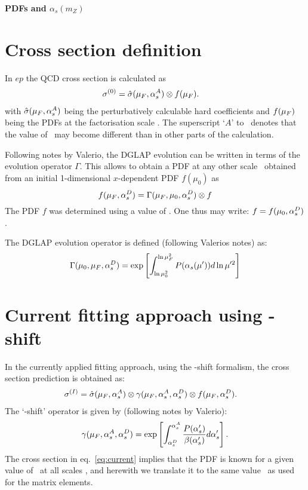 \documentclass[12pt]{article}
\begin{document}
\vspace{1cm}
\begin{center}
\begin{Large}

{\bf     \boldmath
  PDFs and $\alpha_s(m_Z)$
}
\end{Large}
\end{center}
\vspace{0.5cm}

\section{Cross section definition}
In $ep$ the QCD cross section is calculated as
\begin{align}
  \sigma^{(0)} &= \hat\sigma(\mu_{F},\alpha_s^A) \otimes f(\mu_{F}).
\label{eq:sig0}
\end{align}
with $\hat\sigma(\mu_{F},\alpha_s^A)$ being the perturbatively calculable hard coefficients
and $f(\mu_{F})$ being the PDFs at the factorisation scale \muf.
The superscript `$A$' to \as\ denotes that the value of \asmz\ may become different than in other parts of the calculation.

Following notes by Valerio, the DGLAP evolution can be written
in terms of the evolution operator $\Gamma$. 
This allows to obtain a PDF at any other scale \muf\ obtained from an initial 1-dimensional $x$-dependent PDF $f(\mu_0)$ as
\begin{equation}
  f(\mu_{F},\alpha_s^D) = \Gamma(\mu_{F},\mu_0,\alpha_s^D) \otimes f
\end{equation}
The PDF $f$ was determined using a value of \asD. One thus may write: $f = f(\mu_0,\alpha_s^D)$.

The DGLAP evolution operator is defined (following Valerios notes) as:
\begin{align}
  \Gamma(\mu_0,\mu_{F},\alpha_s^D)  = \exp\left[ \int_{\ln\mu^2_0}^{\ln\mu_{F}^2} P(\alpha_s(\mu^\prime) ) d\ln\mu^{\prime2} \right]
\end{align}



\section{Current fitting approach using \boldmath\muf-shift}
In the currently applied fitting approach, using the \muf-shift formalism, the cross section
prediction is obtained as:
\begin{align}
  \sigma^{(I)} &= \hat\sigma(\mu_{F},\alpha_s^A) \otimes \gamma(\mu_{F},\alpha_s^A,\alpha_s^D) \otimes f(\mu_{F},\alpha_s^D).
\label{eq:current}
\end{align}
The `\muf-shift' operator is given by (following notes by Valerio):
\begin{align}
  \gamma(\mu_{F},\alpha_s^A,\alpha_s^D) = \exp\left[\int_{\alpha_s^D}^{\alpha_s^A} \frac{P(\alpha_s^\prime)}{\beta(\alpha_s^\prime) } d\alpha_s^\prime \right]. 
\end{align}
The cross section in eq.~\ref{eq:current} implies that the PDF is known for a given
value of \asD\ at all scales \muf, and herewith we translate it to the same value
\asA\ as used for the matrix elements.
\end{document}
